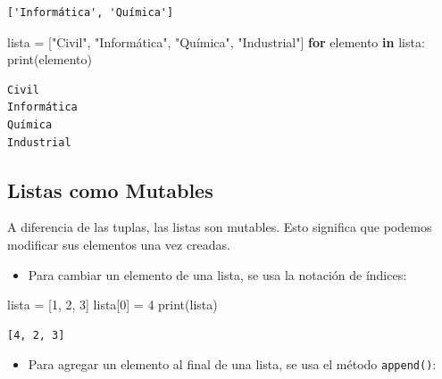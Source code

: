 \documentclass[
  letterpaper,
  DIV=11,
  numbers=noendperiod]{scrreprt}
\newenvironment{Shaded}{\begin{snugshade}}{\end{snugshade}}
\newcommand{\BuiltInTok}[1]{\textcolor[rgb]{0.00,0.23,0.31}{#1}}
\newcommand{\ControlFlowTok}[1]{\textcolor[rgb]{0.00,0.23,0.31}{\textbf{#1}}}
\newcommand{\DecValTok}[1]{\textcolor[rgb]{0.68,0.00,0.00}{#1}}
\newcommand{\KeywordTok}[1]{\textcolor[rgb]{0.00,0.23,0.31}{\textbf{#1}}}
\newcommand{\NormalTok}[1]{\textcolor[rgb]{0.00,0.23,0.31}{#1}}
\newcommand{\OperatorTok}[1]{\textcolor[rgb]{0.37,0.37,0.37}{#1}}
\newcommand{\StringTok}[1]{\textcolor[rgb]{0.13,0.47,0.30}{#1}}
\providecommand{\tightlist}{%
  \setlength{\itemsep}{0pt}\setlength{\parskip}{0pt}}\usepackage{longtable,booktabs,array}
\begin{document}
\begin{verbatim}
['Informática', 'Química']
\end{verbatim}

\begin{Shaded}
\begin{Highlighting}[]
\NormalTok{lista }\OperatorTok{=}\NormalTok{ [}\StringTok{"Civil"}\NormalTok{, }\StringTok{"Informática"}\NormalTok{, }\StringTok{"Química"}\NormalTok{, }\StringTok{"Industrial"}\NormalTok{]}
\ControlFlowTok{for}\NormalTok{ elemento }\KeywordTok{in}\NormalTok{ lista:}
    \BuiltInTok{print}\NormalTok{(elemento)}
\end{Highlighting}
\end{Shaded}

\begin{verbatim}
Civil
Informática
Química
Industrial
\end{verbatim}

\subsection{Listas como Mutables}\label{listas-como-mutables}

A diferencia de las tuplas, las listas son mutables. Esto significa que
podemos modificar sus elementos una vez creadas.

\begin{itemize}
\tightlist
\item
  Para cambiar un elemento de una lista, se usa la notación de índices:
\end{itemize}

\begin{Shaded}
\begin{Highlighting}[]
\NormalTok{lista }\OperatorTok{=}\NormalTok{ [}\DecValTok{1}\NormalTok{, }\DecValTok{2}\NormalTok{, }\DecValTok{3}\NormalTok{]}
\NormalTok{lista[}\DecValTok{0}\NormalTok{] }\OperatorTok{=} \DecValTok{4}
\BuiltInTok{print}\NormalTok{(lista)}
\end{Highlighting}
\end{Shaded}

\begin{verbatim}
[4, 2, 3]
\end{verbatim}

\begin{itemize}
\tightlist
\item
  Para agregar un elemento al final de una lista, se usa el método
  \texttt{append()}:
\end{itemize}
\end{document}
